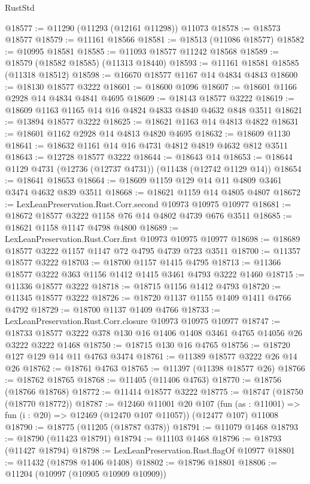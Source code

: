 \begin{lexlean}{RustStd}
\begin{coremodule}
@18577 := @11290 (@11293 (@12161 @11298)) @11073
@18578 := @18573 @18577
@18579 := @11161 @18566
@18581 := @18513 (@11086 @18577)
@18582 := @10995 @18581
@18585 := @11093 @18577 @11242 @18568
@18589 := @18579 (@18582 @18585) (@11313 @18440)
@18593 := @11161 @18581 @18585 (@11318 @18512)
@18598 := @16670 @18577 @1167 @14 @4834 @4843
@18600 := @18130 @18577 @3222
@18601 := @18600 @1096
@18607 := @18601 @1166 @2928 @14 @4834 @4841 @4695
@18609 := @18143 @18577 @3222
@18619 := @18609 @1163 @1165 @14 @16 @4824 @4833 @4840 @4632 @848 @3511
@18621 := @13894 @18577 @3222
@18625 := @18621 @1163 @14 @4813 @4822
@18631 := @18601 @1162 @2928 @14 @4813 @4820 @4695
@18632 := @18609 @1130
@18641 := @18632 @1161 @14 @16 @4731 @4812 @4819 @4632 @812 @3511
@18643 := @12728 @18577 @3222
@18644 := @18643 @14
@18653 := @18644 @1129 @4731 (@12736 (@12737 @4731)) (@11438 (@12742 @1129 @14))
@18654 := @18641 @18653
@18664 := @18609 @1159 @129 @14 @11 @4809 @3461 @3474 @4632 @839 @3511
@18668 := @18621 @1159 @14 @4805 @4807
@18672 := LexLeanPreservation.Rust.Corr.second @10973 @10975 @10977
@18681 := @18672 @18577 @3222 @1158 @76 @14 @4802 @4739 @676 @3511
@18685 := @18621 @1158 @1147 @4798 @4800
@18689 := LexLeanPreservation.Rust.Corr.first @10973 @10975 @10977
@18698 := @18689 @18577 @3222 @1157 @1147 @72 @4795 @4739 @723 @3511
@18700 := @11357 @18577 @3222
@18703 := @18700 @1157 @1415 @4795
@18713 := @11366 @18577 @3222 @363 @1156 @1412 @1415 @3461 @4793 @3222 @1460
@18715 := @11336 @18577 @3222
@18718 := @18715 @1156 @1412 @4793
@18720 := @11345 @18577 @3222
@18726 := @18720 @1137 @1155 @1409 @1411 @4766 @4792
@18729 := @18700 @1137 @1409 @4766
@18733 := LexLeanPreservation.Rust.Corr.closure @10973 @10975 @10977
@18747 := @18733 @18577 @3222 @378 @130 @16 @1406 @1408 @3461 @4765 @14056 @26 @3222 @3222 @1468
@18750 := @18715 @130 @16 @4765
@18756 := @18720 @127 @129 @14 @11 @4763 @3474
@18761 := @11389 @18577 @3222 @26 @14 @26
@18762 := @18761 @4763
@18765 := @11397 (@11398 @18577 @26)
@18766 := @18762 @18765
@18768 := @11405 (@11406 @4763)
@18770 := @18756 (@18766 @18768)
@18772 := @11414 @18577 @3222
@18775 := @18747 (@18750 (@18770 @18772))
@18787 := @12460
    @11001
    @20
    @107
    (fun (as : @11001) => fun (i : @20) => @12469 (@12470 @107 @11057))
    (@12477 @107)
    @11008
@18790 := @18775 (@11205 (@18787 @378))
@18791 := @11079 @1468
@18793 := @18790 (@11423 @18791)
@18794 := @11103 @1468
@18796 := @18793 (@11427 @18794)
@18798 := LexLeanPreservation.Rust.flagOf @10977
@18801 := @11432 (@18798 @1406 @1408)
@18802 := @18796 @18801
@18806 := @11204 (@10997 (@10905 @10909 @10909))

\end{coremodule}
\end{lexlean}

